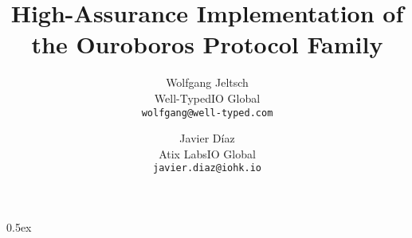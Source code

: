 \documentclass[a4paper,11pt]{article}
\newcommand{\authorinfo}[3]
    {#1\medskip\\\small#2\smallskip\\\small\texttt{#3}}
\newcommand{\andalso}
    {\quad\enspace}
\begin{document}
\title{High-Assurance Implementation of the Ouroboros Protocol Family}
\author{%
    \authorinfo
        {Wolfgang Jeltsch}
        {Well-Typed\andalso IO Global}
        {wolfgang@well-typed.com}%
    \and
    \authorinfo
        {Javier Díaz}
        {Atix Labs\andalso IO Global}
        {javier.diaz@iohk.io}%
}

\maketitle

\tableofcontents

\parindent 0pt\parskip 0.5ex


\end{document}
